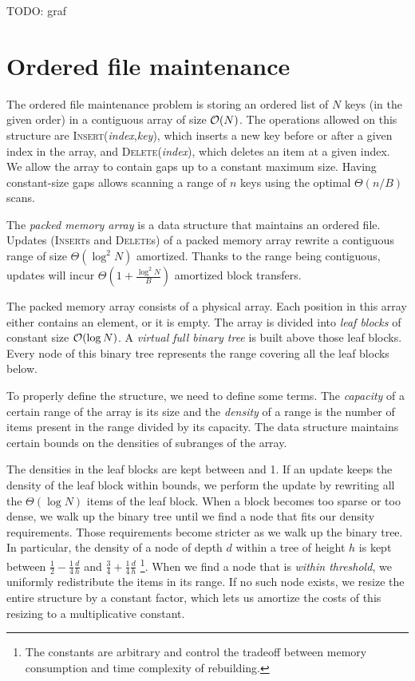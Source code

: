 TODO: graf

\section{Ordered file maintenance}
The ordered file maintenance problem is storing an ordered list of $N$ keys
(in the given order) in a contiguous array of size $\mathcal{O}(N)$. The operations
allowed on this structure are \textsc{Insert}(\textit{index},\textit{key}),
which inserts a new key before or after a given index in the array,
and \textsc{Delete}(\textit{index}), which deletes an item at a given index.
We allow the array to contain gaps up to a constant maximum size.
Having constant-size gaps allows scanning a range of $n$ keys using the
optimal $\Theta(n/B)$ scans.

The \textit{packed memory array} is a data structure that maintains an ordered
file. Updates (\textsc{Insert}s and \textsc{Delete}s) of a packed memory array
rewrite a contiguous range of size $\Theta(\log^2 N)$ amortized.
Thanks to the range being contiguous, updates will incur
$\Theta(1+\frac{\log^2 N}{B})$ amortized block transfers.

The packed memory array consists of a physical array. Each position in this
array either contains an element, or it is empty.
The array is divided into \textit{leaf blocks} of constant size $\mathcal{O}(\log N)$.
A \textit{virtual full binary tree} is built above those leaf blocks. Every
node of this binary tree represents the range covering all the leaf blocks below.

To properly define the structure, we need to define some terms. The
\textit{capacity} of a certain range of the array is its size and the
\textit{density} of a range is the number of items present in the range divided
by its capacity.
The data structure maintains certain bounds on the densities of subranges of
the array.

The densities in the leaf blocks are kept between  %
and 1. If an update keeps the density of the leaf block within bounds,
we perform the update by rewriting all the $\Theta(\log N)$ items
of the leaf block.
When a block becomes too sparse or too dense, we walk up the binary
tree until we find a node that fits our density requirements.
Those requirements become stricter as we walk up the binary tree.
In particular, the density of a node of depth $d$ within a tree of height $h$
is kept between $\frac{1}{2}-\frac{1}{4}\frac{d}{h}$ and $\frac{3}{4}+\frac{1}{4}\frac{d}{h}$
\footnote{The constants are arbitrary and control the tradeoff
between memory consumption and time complexity of rebuilding.}.
When we find a node that is \textit{within threshold}, we uniformly redistribute
the items in its range. If no such node exists, we resize the entire structure
by a constant factor, which lets us amortize the costs of this resizing to
a multiplicative constant.


